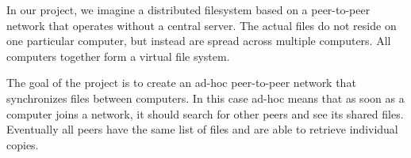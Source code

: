% 
% 

In our project, we imagine a distributed filesystem based on a peer-to-peer network that operates without a central server. 
The actual files do not reside on one particular computer, but instead are spread across multiple computers. All computers together form a virtual file system.

The goal of the project is to create an ad-hoc peer-to-peer network that synchronizes files between  computers. In this case ad-hoc means that as soon as a computer joins a network, it should search for other peers and see its shared files. Eventually all peers have the same list of files and are able to retrieve individual copies.

